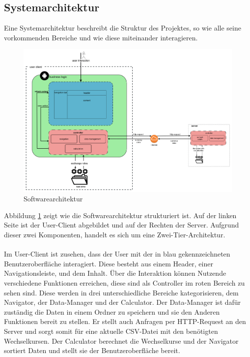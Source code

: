 \documentclass[conference]{IEEEtran}
\begin{document}
\subsection{Systemarchitektur}
Eine Systemarchitektur beschreibt die Struktur des Projektes, so wie alle seine vorkommenden Bereiche und wie diese miteinander interagieren. 

\begin{figure}[h]
	\centering
	\includegraphics[width=1\linewidth, frame]{Software-Architektur_SWEII}
	\caption[Softwarearchitektur]{Softwarearchitektur}
	\label{fig:software-architektursweii}
\end{figure}
\noindent
Abbildung \ref{fig:software-architektursweii} zeigt wie die Softwarearchitektur strukturiert ist. Auf der linken Seite ist der User-Client abgebildet und auf der Rechten der Server. Aufgrund dieser zwei Komponenten, handelt es sich um eine Zwei-Tier-Architektur. \\\\
Im User-Client ist zusehen, dass der User mit der in blau gekennzeichneten Benutzeroberfläche interagiert. Diese besteht aus einem Header, einer Navigationsleiste, und dem Inhalt. Über die Interaktion können Nutzende verschiedene Funktionen erreichen, diese sind als Controller im roten Bereich zu sehen sind. Diese werden in drei unterschiedliche Bereiche kategorisieren, dem Navigator, der Data-Manager und der Calculator. Der Data-Manager ist dafür zuständig die Daten in einem Ordner zu speichern und sie den Anderen Funktionen bereit zu stellen. Er stellt auch Anfragen per HTTP-Request an den Server und sorgt somit für eine aktuelle CSV-Datei mit den benötigten Wechselkursen. Der Calculator berechnet die Wechselkurse und der Navigator sortiert Daten und stellt sie der Benutzeroberfläche bereit. \\\\
\end{document}
